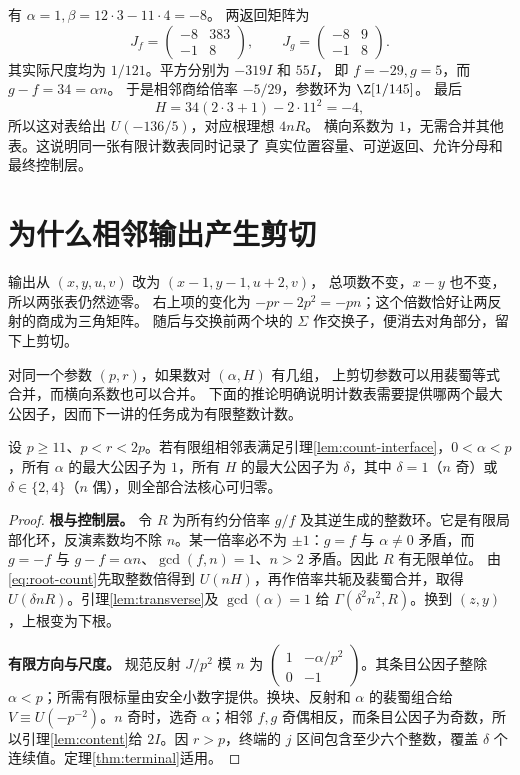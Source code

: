 有 $\alpha=1,\beta=12\cdot3-11\cdot4=-8$。
两返回矩阵为
\[
J_f=\begin{pmatrix}-8&383\\-1&8\end{pmatrix},\qquad
J_g=\begin{pmatrix}-8&9\\-1&8\end{pmatrix}.
\]
其实际尺度均为 $1/121$。平方分别为 $-319I$ 和 $55I$，
即 $f=-29,g=5$，而 $g-f=34=\alpha n$。
于是相邻商给倍率 $-5/29$，参数环为 $\Z[1/145]$。
最后
\[
H=34(2\cdot3+1)-2\cdot11^2=-4,
\]
所以这对表给出 $U(-136/5)$，对应根理想 $4nR$。
横向系数为 $1$，无需合并其他表。这说明同一张有限计数表同时记录了
真实位置容量、可逆返回、允许分母和最终控制层。



\section{为什么相邻输出产生剪切}
输出从 $(x,y,u,v)$ 改为 $(x-1,y-1,u+2,v)$，
总项数不变，$x-y$ 也不变，所以两张表仍然迹零。
右上项的变化为 $-pr-2p^2=-pn$；这个倍数恰好让两反射的商成为三角矩阵。
随后与交换前两个块的 $\Sigma$ 作交换子，便消去对角部分，留下上剪切。

对同一个参数 $(p,r)$，如果数对 $(\alpha,H)$ 有几组，
上剪切参数可以用裴蜀等式合并，而横向系数也可以合并。
下面的推论明确说明计数表需要提供哪两个最大公因子，因而下一讲的任务成为有限整数计数。

\begin{corollary}[相邻输出表的充分条件]\label{cor:resource}
设 $p\ge11$、$p<r<2p$。若有限组相邻表满足引理\ref{lem:count-interface}，$0<\alpha<p$，所有 $\alpha$ 的最大公因子为 $1$，所有 $H$ 的最大公因子为 $\delta$，其中 $\delta=1$（$n$ 奇）或 $\delta\in\{2,4\}$（$n$ 偶），则全部合法核心可归零。
\end{corollary}
\begin{proof}

\par\noindent\textbf{根与控制层。}
令 $R$ 为所有约分倍率 $g/f$ 及其逆生成的整数环。它是有限局部化环，反演素数均不除 $n$。某一倍率必不为 $\pm1$：$g=f$ 与 $\alpha\ne0$ 矛盾，而 $g=-f$ 与 $g-f=\alpha n$、$\gcd(f,n)=1$、$n>2$ 矛盾。因此 $R$ 有无限单位。
由\eqref{eq:root-count}先取整数倍得到 $U(nH)$，再作倍率共轭及裴蜀合并，取得 $U(\delta nR)$。引理\ref{lem:transverse}及 $\gcd(\alpha)=1$ 给 $\Gamma(\delta^2n^2,R)$。换到 $(z,y)$，上根变为下根。

\par\noindent\textbf{有限方向与尺度。}
规范反射 $J/p^2$ 模 $n$ 为 $\left(\begin{smallmatrix}1&-\alpha/p^2\\0&-1\end{smallmatrix}\right)$。其条目公因子整除 $\alpha<p$；所需有限标量由安全小数字提供。换块、反射和 $\alpha$ 的裴蜀组合给 $V\equiv U(-p^{-2})$。$n$ 奇时，选奇 $\alpha$；相邻 $f,g$ 奇偶相反，而条目公因子为奇数，所以引理\ref{lem:content}给 $2I$。因 $r>p$，终端的 $j$ 区间包含至少六个整数，覆盖 $\delta$ 个连续值。定理\ref{thm:terminal}适用。
\end{proof}

